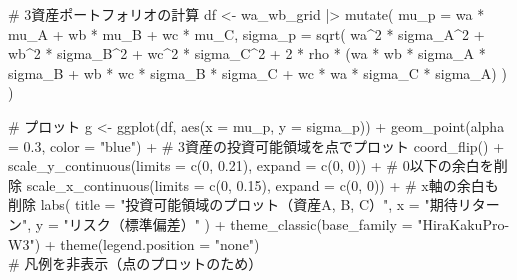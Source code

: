 \documentclass[
  letterpaper,
  pandoc,
  ja=standard,
  jafont = hiragino-pron]{ltjsbook}
\newenvironment{Shaded}{\begin{snugshade}}{\end{snugshade}}
\newcommand{\AttributeTok}[1]{\textcolor[rgb]{0.40,0.45,0.13}{#1}}
\newcommand{\CommentTok}[1]{\textcolor[rgb]{0.37,0.37,0.37}{#1}}
\newcommand{\DecValTok}[1]{\textcolor[rgb]{0.68,0.00,0.00}{#1}}
\newcommand{\FloatTok}[1]{\textcolor[rgb]{0.68,0.00,0.00}{#1}}
\newcommand{\FunctionTok}[1]{\textcolor[rgb]{0.28,0.35,0.67}{#1}}
\newcommand{\NormalTok}[1]{\textcolor[rgb]{0.00,0.23,0.31}{#1}}
\newcommand{\OtherTok}[1]{\textcolor[rgb]{0.00,0.23,0.31}{#1}}
\newcommand{\SpecialCharTok}[1]{\textcolor[rgb]{0.37,0.37,0.37}{#1}}
\newcommand{\StringTok}[1]{\textcolor[rgb]{0.13,0.47,0.30}{#1}}
\begin{document}
\begin{Shaded}
\begin{Highlighting}[]
\CommentTok{\# 3資産ポートフォリオの計算}
\NormalTok{df }\OtherTok{\textless{}{-}}\NormalTok{ wa\_wb\_grid }\SpecialCharTok{|\textgreater{}}
  \FunctionTok{mutate}\NormalTok{(}
    \AttributeTok{mu\_p =}\NormalTok{ wa }\SpecialCharTok{*}\NormalTok{ mu\_A }\SpecialCharTok{+}\NormalTok{ wb }\SpecialCharTok{*}\NormalTok{ mu\_B }\SpecialCharTok{+}\NormalTok{ wc }\SpecialCharTok{*}\NormalTok{ mu\_C,}
    \AttributeTok{sigma\_p =} \FunctionTok{sqrt}\NormalTok{(}
\NormalTok{      wa}\SpecialCharTok{\^{}}\DecValTok{2} \SpecialCharTok{*}\NormalTok{ sigma\_A}\SpecialCharTok{\^{}}\DecValTok{2} \SpecialCharTok{+}\NormalTok{ wb}\SpecialCharTok{\^{}}\DecValTok{2} \SpecialCharTok{*}\NormalTok{ sigma\_B}\SpecialCharTok{\^{}}\DecValTok{2} \SpecialCharTok{+}\NormalTok{ wc}\SpecialCharTok{\^{}}\DecValTok{2} \SpecialCharTok{*}\NormalTok{ sigma\_C}\SpecialCharTok{\^{}}\DecValTok{2} \SpecialCharTok{+}
      \DecValTok{2} \SpecialCharTok{*}\NormalTok{ rho }\SpecialCharTok{*}\NormalTok{ (wa }\SpecialCharTok{*}\NormalTok{ wb }\SpecialCharTok{*}\NormalTok{ sigma\_A }\SpecialCharTok{*}\NormalTok{ sigma\_B }\SpecialCharTok{+}\NormalTok{ wb }\SpecialCharTok{*}\NormalTok{ wc }\SpecialCharTok{*}\NormalTok{ sigma\_B }\SpecialCharTok{*}\NormalTok{ sigma\_C }\SpecialCharTok{+}\NormalTok{ wc }\SpecialCharTok{*}\NormalTok{ wa }\SpecialCharTok{*}\NormalTok{ sigma\_C }\SpecialCharTok{*}\NormalTok{ sigma\_A)}
\NormalTok{    )}
\NormalTok{  )}

\CommentTok{\# プロット}
\NormalTok{g }\OtherTok{\textless{}{-}} \FunctionTok{ggplot}\NormalTok{(df, }\FunctionTok{aes}\NormalTok{(}\AttributeTok{x =}\NormalTok{ mu\_p, }\AttributeTok{y =}\NormalTok{ sigma\_p)) }\SpecialCharTok{+}
  \FunctionTok{geom\_point}\NormalTok{(}\AttributeTok{alpha =} \FloatTok{0.3}\NormalTok{, }\AttributeTok{color =} \StringTok{"blue"}\NormalTok{) }\SpecialCharTok{+}  \CommentTok{\# 3資産の投資可能領域を点でプロット}
  \FunctionTok{coord\_flip}\NormalTok{() }\SpecialCharTok{+}
  \FunctionTok{scale\_y\_continuous}\NormalTok{(}\AttributeTok{limits =} \FunctionTok{c}\NormalTok{(}\DecValTok{0}\NormalTok{, }\FloatTok{0.21}\NormalTok{), }\AttributeTok{expand =} \FunctionTok{c}\NormalTok{(}\DecValTok{0}\NormalTok{, }\DecValTok{0}\NormalTok{)) }\SpecialCharTok{+}  \CommentTok{\# 0以下の余白を削除}
  \FunctionTok{scale\_x\_continuous}\NormalTok{(}\AttributeTok{limits =} \FunctionTok{c}\NormalTok{(}\DecValTok{0}\NormalTok{, }\FloatTok{0.15}\NormalTok{), }\AttributeTok{expand =} \FunctionTok{c}\NormalTok{(}\DecValTok{0}\NormalTok{, }\DecValTok{0}\NormalTok{)) }\SpecialCharTok{+} \CommentTok{\# x軸の余白も削除}
  \FunctionTok{labs}\NormalTok{(}
    \AttributeTok{title =} \StringTok{"投資可能領域のプロット（資産A, B, C）"}\NormalTok{,}
    \AttributeTok{x =} \StringTok{"期待リターン"}\NormalTok{,}
    \AttributeTok{y =} \StringTok{"リスク（標準偏差）"}
\NormalTok{  ) }\SpecialCharTok{+}
  \FunctionTok{theme\_classic}\NormalTok{(}\AttributeTok{base\_family =} \StringTok{"HiraKakuPro{-}W3"}\NormalTok{) }\SpecialCharTok{+}
  \FunctionTok{theme}\NormalTok{(}\AttributeTok{legend.position =} \StringTok{"none"}\NormalTok{)  }\CommentTok{\# 凡例を非表示（点のプロットのため）}


\end{Highlighting}
\end{Shaded}
\end{document}
